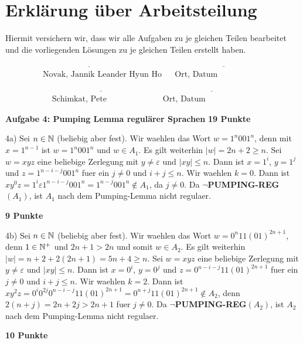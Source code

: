 \documentclass[twoside,10pt,fleqn,headinclude=false]{scrartcl}
\begin{document}
\section*{Erklärung über Arbeitsteilung}

Hiermit versichern wir, dass wir alle Aufgaben zu je gleichen Teilen bearbeitet und die vorliegenden Lösungen zu je gleichen Teilen erstellt haben.

\begin{align*}
	& \underline{\hspace{5cm}} && \underline{\hspace{5cm}}\\
	& \text{ Novak, Jannik Leander Hyun Ho} && \text{Ort, Datum}
\end{align*}

\begin{align*}
	& \underline{\hspace{5cm}} && \underline{\hspace{5cm}}\\
	& \text{Schimkat, Pete} && \text{Ort, Datum}
\end{align*}

\newpage

\textbf{Aufgabe 4: Pumping Lemma regulärer Sprachen} \hfill \textbf{19 Punkte}
\begin{compactenum}
	\item[4a)] Sei $n \in \mathbb{N}$ (beliebig aber fest). Wir waehlen das Wort $w = 1^{n}001^{n}$, denn mit $x=1^{n-1}$ ist $w = 1^{n}001^{n}$ und $w \in A_1$. Es gilt weiterhin $\vert w\vert = 2n + 2 \geq n$. Sei $w=xyz$ eine beliebige Zerlegung mit $y\neq \varepsilon$ und $\vert xy\vert \leq n$. Dann ist $x=1^i$, $y=1^j$ und $z=1^{n-i-j}001^n$ fuer ein $j \neq 0$ und $i+j\leq n$. Wir waehlen $k = 0$. Dann ist $xy^{0}z = 1^{i} \varepsilon1^{n-i-j}001^n=1^{n-j}001^n \not \in A_1$, da $j \neq 0$. Da $\neg$\textbf{PUMPING-REG}$(A_1)$, ist $A_1$ nach dem Pumping-Lemma nicht regulaer.
	\item[] \hfill \textbf{9 Punkte}
	\item[4b)] Sei $n \in \mathbb{N}$ (beliebig aber fest). Wir waehlen das Wort $w = 0^{n}11(01)^{2n+1}$, denn $1 \in \mathbb{N}^{+}$ und $2n+1 > 2n$ und somit $w \in A_2$. Es gilt weiterhin $\vert w\vert = n +2 + 2(2n+1)=5n+4 \geq n$. Sei $w=xyz$ eine beliebige Zerlegung mit $y\neq \varepsilon$ und $\vert xy\vert \leq n$. Dann ist $x=0^i$, $y=0^j$ und $z=0^{n-i-j}11(01)^{2n+1}$ fuer ein $j \neq 0$ und $i+j\leq n$. Wir waehlen $k = 2$. Dann ist $xy^{2}z = 0^{i}0^{2j}0^{n-i-j}11(01)^{2n+1}=0^{n+j}11(01)^{2n+1} \not \in A_2$, denn  $2(n+j) = 2n+2j > 2n+1$ fuer $j \neq 0$. Da $\neg$\textbf{PUMPING-REG}$(A_2)$, ist $A_2$ nach dem Pumping-Lemma nicht regulaer.
	\item[] \hfill \textbf{10 Punkte}

\end{compactenum}
\end{document}
